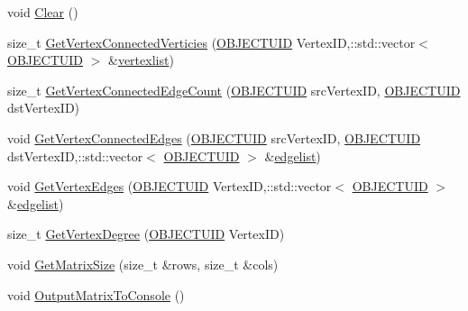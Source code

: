 \begin{DoxyCompactItemize}
\item 
void \hyperlink{class_c_adjacency_matrix_a5fee4d87d4e38245295322e061d8a6e1}{Clear} ()
\item 
size\+\_\+t \hyperlink{class_c_adjacency_matrix_a7a20f89a2297c9d0bfb4eda5d9995c16}{Get\+Vertex\+Connected\+Verticies} (\hyperlink{_object_database_defines_8h_a164ec120b01429b93c9cd0bef2a67e64}{O\+B\+J\+E\+C\+T\+U\+I\+D} Vertex\+I\+D,\+::std\+::vector$<$ \hyperlink{_object_database_defines_8h_a164ec120b01429b93c9cd0bef2a67e64}{O\+B\+J\+E\+C\+T\+U\+I\+D} $>$ \&\hyperlink{class_c_adjacency_matrix_a8693a9f946f9f2142a9a7cb2b84f4b4c}{vertexlist})
\item 
size\+\_\+t \hyperlink{class_c_adjacency_matrix_a227945c9518613867ed8ca4f54beb6fd}{Get\+Vertex\+Connected\+Edge\+Count} (\hyperlink{_object_database_defines_8h_a164ec120b01429b93c9cd0bef2a67e64}{O\+B\+J\+E\+C\+T\+U\+I\+D} src\+Vertex\+I\+D, \hyperlink{_object_database_defines_8h_a164ec120b01429b93c9cd0bef2a67e64}{O\+B\+J\+E\+C\+T\+U\+I\+D} dst\+Vertex\+I\+D)
\item 
void \hyperlink{class_c_adjacency_matrix_a809bba3b1d88bfe5dd0c9457ccfcc3b3}{Get\+Vertex\+Connected\+Edges} (\hyperlink{_object_database_defines_8h_a164ec120b01429b93c9cd0bef2a67e64}{O\+B\+J\+E\+C\+T\+U\+I\+D} src\+Vertex\+I\+D, \hyperlink{_object_database_defines_8h_a164ec120b01429b93c9cd0bef2a67e64}{O\+B\+J\+E\+C\+T\+U\+I\+D} dst\+Vertex\+I\+D,\+::std\+::vector$<$ \hyperlink{_object_database_defines_8h_a164ec120b01429b93c9cd0bef2a67e64}{O\+B\+J\+E\+C\+T\+U\+I\+D} $>$ \&\hyperlink{class_c_adjacency_matrix_a22be75654b2f4c6c0e36471c5d6521fd}{edgelist})
\item 
void \hyperlink{class_c_adjacency_matrix_a2b3468fb1ba9519a9ad92f11d486dc60}{Get\+Vertex\+Edges} (\hyperlink{_object_database_defines_8h_a164ec120b01429b93c9cd0bef2a67e64}{O\+B\+J\+E\+C\+T\+U\+I\+D} Vertex\+I\+D,\+::std\+::vector$<$ \hyperlink{_object_database_defines_8h_a164ec120b01429b93c9cd0bef2a67e64}{O\+B\+J\+E\+C\+T\+U\+I\+D} $>$ \&\hyperlink{class_c_adjacency_matrix_a22be75654b2f4c6c0e36471c5d6521fd}{edgelist})
\item 
size\+\_\+t \hyperlink{class_c_adjacency_matrix_ae022c92b6982e10248537d833c85955f}{Get\+Vertex\+Degree} (\hyperlink{_object_database_defines_8h_a164ec120b01429b93c9cd0bef2a67e64}{O\+B\+J\+E\+C\+T\+U\+I\+D} Vertex\+I\+D)
\item 
void \hyperlink{class_c_adjacency_matrix_a904c3cdcf9fc919a0658d3027a8bc576}{Get\+Matrix\+Size} (size\+\_\+t \&rows, size\+\_\+t \&cols)
\item 
void \hyperlink{class_c_adjacency_matrix_ad05c497b6db20cee36f719e0564dfa24}{Output\+Matrix\+To\+Console} ()
\end{DoxyCompactItemize}


